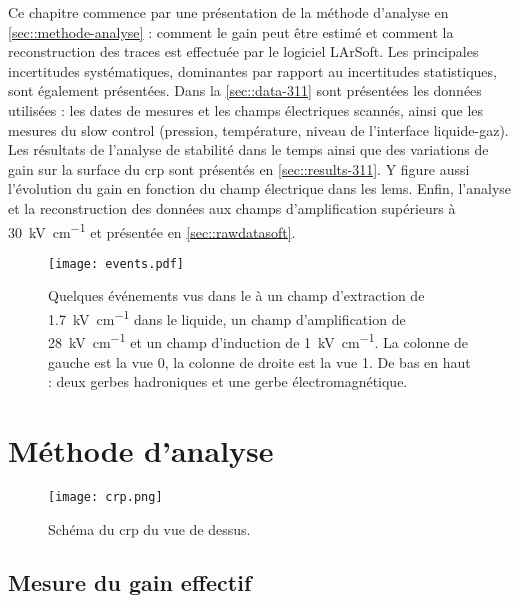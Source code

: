     Ce chapitre commence par une présentation de la méthode d'analyse en \autoref{sec::methode-analyse} : comment le gain peut être estimé et comment la reconstruction des traces est effectuée par le logiciel LArSoft. Les principales incertitudes systématiques, dominantes par rapport au incertitudes statistiques, sont également présentées. Dans la \autoref{sec::data-311} sont présentées les données utilisées : les dates de mesures et les champs électriques scannés, ainsi que les mesures du slow control (pression, température, niveau de l'interface liquide-gaz). Les résultats de l'analyse de stabilité dans le temps ainsi que des variations de gain sur la surface du \gls{crp} sont présentés en \autoref{sec::results-311}. Y figure aussi l'évolution du gain en fonction du champ électrique dans les \glspl{lem}. Enfin, l'analyse et la reconstruction des données aux champs d'amplification supérieurs à \SI{30}{\kilo\volt\per\centi\meter} et présentée en \autoref{sec::rawdatasoft}.

    \begin{figure}[htpb]
      \centering
      \texttt{[image: events.pdf]}
      \caption[Quelques événements vus dans le \TOO{}]{\label{fig::data-sample}Quelques événements vus dans le \TOO{} à un champ d'extraction de \SI{1.7}{\kilo\volt\per\centi\meter} dans le liquide, un champ d'amplification de \SI{28}{\kilo\volt\per\centi\meter} et un champ d'induction de \SI{1}{\kilo\volt\per\centi\meter}. La colonne de gauche est la vue 0, la colonne de droite est la vue 1. De bas en haut : deux gerbes hadroniques et une gerbe électromagnétique.}
    \end{figure}
  
  \section{Méthode d'analyse}\label{sec::methode-analyse}

    \begin{figure}[htpb]
      \centering
      \texttt{[image: crp.png]}
      \caption[Schéma du CRP du \TOO{} vue de dessus]{\label{fig::crp-chap5}Schéma du \gls{crp} du \TOO{} vue de dessus.}
    \end{figure}

    \subsection{Mesure du gain effectif}

